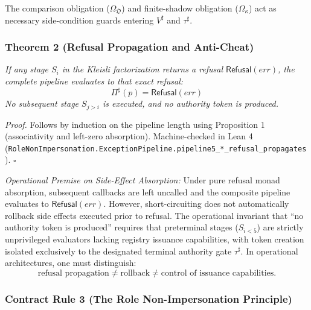 \documentclass[
  10pt,
]{article}
\begin{document}
The comparison obligation (\hypertarget{math-E0026-0151}{}{\(\Omega_{\mathfrak{O}}\)}) and finite-shadow obligation (\hypertarget{math-E0027-0152}{}{\(\Omega_{\kappa}\)}) act as necessary side-condition guards entering \hypertarget{math-E0113-0153}{}{\(V^\sharp\)} and \hypertarget{math-E0114-0154}{}{\(\tau^\sharp\)}.

\subsubsection{Theorem 2 (Refusal Propagation and Anti-Cheat)}\label{theorem-2-refusal-propagation-and-anti-cheat}

\emph{If any stage \hypertarget{math-E0115-0155}{}{\(S_i\)} in the Kleisli factorization returns a refusal \hypertarget{math-E0116-0156}{}{\(\mathsf{Refusal}(err)\)}, the complete pipeline evaluates to that exact refusal:} \hypertarget{math-E0117-0157}{}{\[\Pi^\sharp(p) = \mathsf{Refusal}(err)\]} \emph{No subsequent stage \hypertarget{math-E0118-0158}{}{\(S_{j > i}\)} is executed, and no authority token is produced.}

\emph{Proof.} Follows by induction on the pipeline length using Proposition 1 (associativity and left-zero absorption). Machine-checked in Lean 4 (\texttt{RoleNonImpersonation.ExceptionPipeline.pipeline5\_*\_refusal\_propagates}). \hypertarget{math-E0036-0159}{}{\(\square\)}

\emph{Operational Premise on Side-Effect Absorption:} Under pure refusal monad absorption, subsequent callbacks are left uncalled and the composite pipeline evaluates to \hypertarget{math-E0116-0160}{}{\(\mathsf{Refusal}(err)\)}. However, short-circuiting does not automatically rollback side effects executed prior to refusal. The operational invariant that ``no authority token is produced'' requires that preterminal stages (\hypertarget{math-E0119-0161}{}{\(S_{i < 5}\)}) are strictly unprivileged evaluators lacking registry issuance capabilities, with token creation isolated exclusively to the designated terminal authority gate \hypertarget{math-E0114-0162}{}{\(\tau^\sharp\)}. In operational architectures, one must distinguish: \hypertarget{math-E0120-0163}{}{\[\text{refusal propagation} \ne \text{rollback} \ne \text{control of issuance capabilities}.\]}

\subsubsection{Contract Rule 3 (The Role Non-Impersonation Principle)}\label{contract-rule-3-the-role-non-impersonation-principle}
\end{document}
